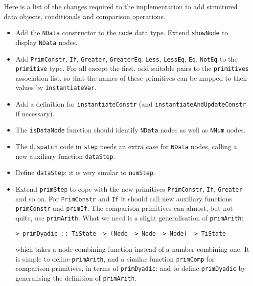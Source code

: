 Here is a list of the changes required to the implementation to add
structured data objects, conditionals and comparison operations.
\begin{itemize}
\item
Add the \mbox{\tt NData} constructor to the \mbox{\tt node} data type.  Extend \mbox{\tt showNode} to
display \mbox{\tt NData} nodes.
\item
Add \mbox{\tt PrimConstr}, \mbox{\tt If}, \mbox{\tt Greater}, \mbox{\tt GreaterEq}, \mbox{\tt Less}, \mbox{\tt LessEq}, \mbox{\tt Eq}, \mbox{\tt NotEq}
to the \mbox{\tt primitive} type.
For all except the first, add suitable pairs to the \mbox{\tt primitives} association
list, so that the names of these primitives can be mapped to their
values by \mbox{\tt instantiateVar}.
\item
Add a definition for \mbox{\tt instantiateConstr} (and \mbox{\tt instantiateAndUpdateConstr}
if necessary).
\item
The \mbox{\tt isDataNode} function should identify \mbox{\tt NData} nodes as well as \mbox{\tt NNum} nodes.
\item
The \mbox{\tt dispatch} code in \mbox{\tt step} needs an extra case for \mbox{\tt NData} nodes, calling
a new auxiliary function \mbox{\tt dataStep}.
\item
Define \mbox{\tt dataStep}; it is very similar to \mbox{\tt numStep}.
\item
Extend \mbox{\tt primStep} to cope with the new primitives \mbox{\tt PrimConstr}, \mbox{\tt If}, \mbox{\tt Greater}
and so on.
For \mbox{\tt PrimConstr} and \mbox{\tt If} it should call new auxiliary functions \mbox{\tt primConstr}
and \mbox{\tt primIf}.
The comparison primitives can almost, but not quite, use \mbox{\tt primArith}.
What we need is a slight generalisation of \mbox{\tt primArith}:
\begin{verbatim}
> primDyadic :: TiState -> (Node -> Node -> Node) -> TiState
\end{verbatim}
%
which takes a node-combining function instead of a number-combining one.
It is simple to define \mbox{\tt primArith}, and a similar function \mbox{\tt primComp} for
comparison primitives, in terms of \mbox{\tt primDyadic}; and to
define \mbox{\tt primDyadic} by generalising the definition of \mbox{\tt primArith}.
\end{itemize}

